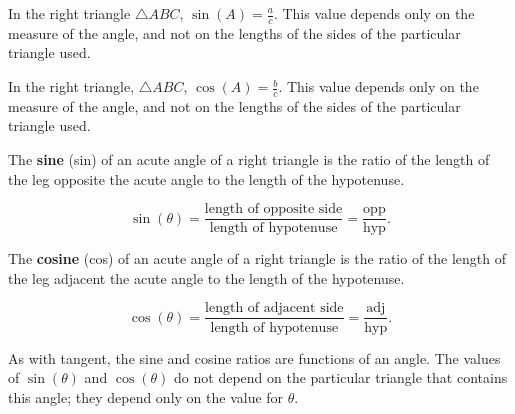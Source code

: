 \begin{figure}[htpb]
  \centering


  \label{fig:find_tan_a}
\end{figure}

In the right triangle $\triangle ABC$, $\sin(A) = \frac{a}{c}$. This value
depends only on the measure of the angle, and not on the lengths of the sides
of the particular triangle used.

In the right triangle, $\triangle ABC$, $\cos(A) = \frac{b}{c}$. This value
depends only on the measure of the angle, and not on the lengths of the sides
of the particular triangle used.

\begin{definition}[Sine]
  \label{def:sine}

  The \textbf{sine} (sin) of an acute angle of a right triangle is the ratio of
  the length of the leg opposite the acute angle to the length of the
  hypotenuse.

  \[ \sin(\theta) = \frac{\textrm{length of opposite side}}{\textrm{length of hypotenuse}}
                  = \frac{\textrm{opp}}{\textrm{hyp}} . \]
\end{definition}

\begin{definition}[Cosine]
  \label{def:cosine}

  The \textbf{cosine} (cos) of an acute angle of a right triangle is the ratio
  of the length of the leg adjacent the acute angle to the length of the
  hypotenuse.

  \[ \cos(\theta) = \frac{\textrm{length of adjacent side}}{\textrm{length of hypotenuse}}
                  = \frac{\textrm{adj}}{\textrm{hyp}} . \]
\end{definition}

As with tangent, the sine and cosine ratios are functions of an angle. The
values of $\sin(\theta)$ and $\cos(\theta)$ do not depend on the particular
triangle that contains this angle; they depend only on the value for $\theta$.

